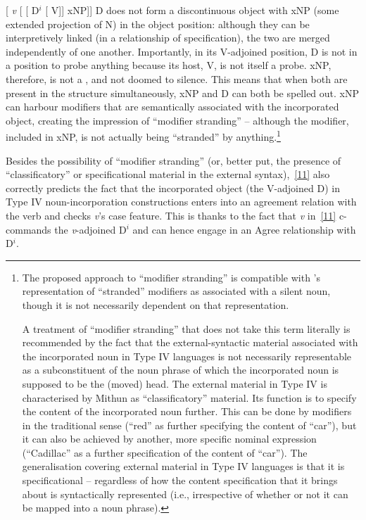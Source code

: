 \documentclass[output=paper]{langsci/langscibook}
\newcommand{\posscite}[1]{\citeauthor{#1}'s \citeyearpar{#1}}
\begin{document}
\begin{refcontext}
\ea  {}[ \emph{v}\tss{\{[+V], \Acc{}, \ldots{}\}} [
[ D$^i$  [ \hspace{-.7ex}V]] xNP]]\label{11}
\z
D does not form a discontinuous object with xNP (some extended projection of N)
in the object position: although they can be interpretively linked (in a
relationship of specification), the two are merged independently of one
another. Importantly, in its V-adjoined position, D is not in a position to
probe anything because its host, V, is not itself a probe. xNP, therefore, is
not a , and not doomed to silence. This means that when both are
present in the structure simultaneously, xNP and D can both be spelled out. xNP
can harbour modifiers that are semantically associated with the incorporated
object, creating the impression of \enquote{modifier stranding} -- although the
modifier, included in xNP, is not actually being \enquote{stranded} by
anything.\footnote{The proposed approach to \enquote{modifier stranding} is
    compatible with \posscite{rosen89} representation of \enquote{stranded}
    modifiers as associated with a silent noun, though it is not necessarily
    dependent on that representation.

A treatment of \enquote{modifier stranding} that does not take this term literally
is recommended by the fact that the external-syntactic material associated with
the incorporated noun in Type IV languages is not necessarily representable as
a subconstituent of the noun phrase of which the incorporated noun is supposed
to be the (moved) head. The external material in Type IV is characterised by
Mithun as \enquote{classificatory} material. Its function is to specify the content
of the incorporated noun further. This can be done by modifiers in the
traditional sense (\enquote{red} as further specifying the content of \enquote{car}), but
it can also be achieved by another, more specific nominal expression
(\enquote{Cadillac} as a further specification of the content of \enquote{car}). The
generalisation covering external material in Type IV languages is that it is
specificational -- regardless of how the content specification that it brings
about is syntactically represented (i.e., irrespective of whether or not it can
be mapped into a noun phrase).}

Besides the possibility of \enquote{modifier stranding} (or, better put, the
presence of \enquote{classificatory} or specificational material in the external
syntax),~\eqref{11} also correctly predicts the fact that the incorporated object
(the V-adjoined D) in Type IV noun-incorporation constructions enters into an
agreement relation with the verb and checks \emph{v}’s case feature. This is
thanks to the fact that \emph{v} in~\eqref{11} c-commands the \emph{v}-adjoined
D$^i$ and can hence engage in an Agree relationship with D$^i$.


\end{refcontext}
\end{document}
